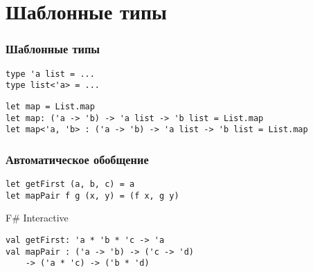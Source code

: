 \documentclass{../../slides-style}
\begin{document}
    \frame{\titlepage}

    \section{Шаблонные типы}
    
    \begin{frame}[fragile]
        \frametitle{Шаблонные типы}
        \begin{verbatim}
type 'a list = ...
type list<'a> = ...
        \end{verbatim}

        \begin{verbatim}
let map = List.map
let map: ('a -> 'b) -> 'a list -> 'b list = List.map
let map<'a, 'b> : ('a -> 'b) -> 'a list -> 'b list = List.map
        \end{verbatim}
    \end{frame}

    \begin{frame}[fragile]
        \frametitle{Автоматическое обобщение}
        \begin{verbatim}
let getFirst (a, b, c) = a
let mapPair f g (x, y) = (f x, g y)
        \end{verbatim}

        \begin{alertblock}{F\# Interactive}
            \begin{verbatim}
val getFirst: 'a * 'b * 'c -> 'a
val mapPair : ('a -> 'b) -> ('c -> 'd) 
    -> ('a * 'c) -> ('b * 'd)
            \end{verbatim}
        \end{alertblock}
    \end{frame}
\end{document}
